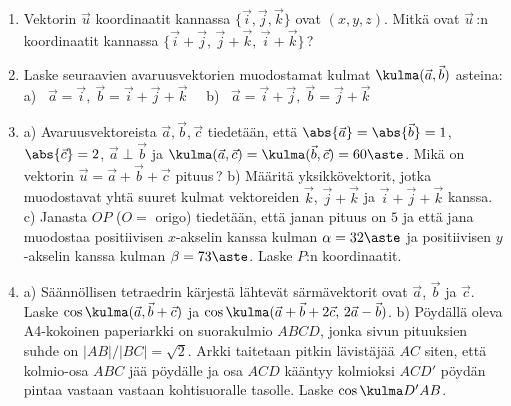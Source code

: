 \Harj
\begin{enumerate}

\item
Vektorin $\vec u$ koordinaatit kannassa $\{\vec i,\vec j,\vec k\}$ ovat $(x,y,z)$. Mitkä
ovat $\vec u\,$:n koordinaatit kannassa $\{\vec i+\vec j,\,\vec j+\vec k,\,\vec i+\vec k\}\,$?

\item
Laske seuraavien avaruusvektorien muodostamat kulmat $\kulma(\vec a,\vec b)$ asteina: \newline
a) \ $\vec a=\vec i,\ \vec b=\vec i+\vec j+\vec k \quad$
b) \ $\vec a=\vec i+\vec j,\ \vec b=\vec j+\vec k$

\item
a) Avaruusvektoreista $\vec a,\vec b,\vec c$ tiedetään, että $\abs{\vec a}=\abs{\vec b}=1$, 
$\abs{\vec c}=2$, $\vec a\perp\vec b$ ja $\kulma(\vec a,\vec c)=\kulma(\vec b,\vec c)=60\aste$.
Mikä on vektorin $\vec u=\vec a+\vec b+\vec c$ pituus\,? \vspace{1mm}\newline
b) Määritä yksikkövektorit, jotka muodostavat yhtä suuret kulmat vektoreiden $\vec k$, 
$\vec j+\vec k$ ja $\vec i+\vec j+\vec k$ kanssa. \vspace{1mm}\newline
c) Janasta $OP$ ($O=$ origo) tiedetään, että janan pituus on $5$ ja että jana muodostaa 
positiivisen $x$-akselin kanssa kulman $\alpha=32\aste$ ja positiivisen $y$-akselin kanssa
kulman $\beta=73\aste$. Laske $P$:n koordinaatit.

\item
a) Säännöllisen tetraedrin kärjestä lähtevät särmävektorit ovat $\vec a$, $\vec b$ ja $\vec c$.
Laske $\cos\kulma(\vec a,\vec b+\vec c)$ ja
$\cos\kulma(\vec a+\vec b+2\vec c,\,2\vec a-\vec b)$. \vspace{1mm}\newline
b) Pöydällä oleva A4-kokoinen paperiarkki on suorakulmio $ABCD$, jonka sivun pituuksien suhde
on $|AB|/|BC|=\sqrt{2}$. Arkki taitetaan pitkin lävistäjää $AC$ siten, että kolmio-osa
$ABC$ jää pöydälle ja osa $ACD$ kääntyy kolmioksi $ACD'$ pöydän pintaa vastaan vastaan
kohtisuoralle tasolle. Laske $\cos\kulma D'AB$.


\end{enumerate}
